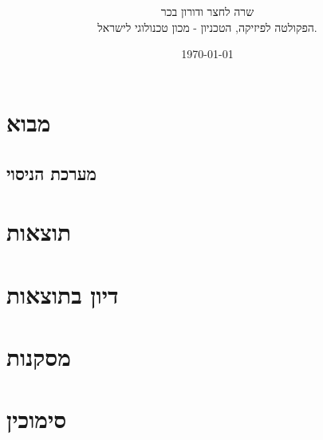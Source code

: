 \documentclass{article}
\title{
}
\author{
שרה לחצר ודורון בכר \\
הפקולטה לפיזיקה, הטכניון - מכון טכנולוגי לישראל.
}
\date{\today}
\begin{document}
\maketitle

\begin{abstract}
\end{abstract}
\section{מבוא}

\subsection{מערכת הניסוי}

\section{תוצאות}

\section{דיון בתוצאות}

\section{מסקנות}

\section*{סימוכין}
\begin{english}
\printbibliography[heading=none]{}
\end{english}
\end{document}
